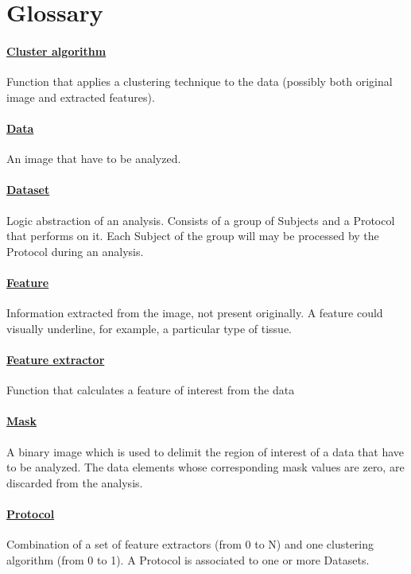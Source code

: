 \section{Glossary}
\label{glossary}

\paragraph{\underline{Cluster algorithm}\\}
Function that applies a clustering technique to the data (possibly both original image and extracted features\g{}).

\paragraph{\underline{Data}\\}
An image that have to be analyzed.

\paragraph{\underline{Dataset}\\}
Logic abstraction of an analysis. Consists of a group of Subjects\g{} and a Protocol\g{} that performs on it. Each Subject\g{} of the group will may be processed by the Protocol\g{} during an analysis.

\paragraph{\underline{Feature}\\}
Information extracted from the image, not present originally. A feature could visually underline, for example, a particular type of tissue.

\paragraph{\underline{Feature extractor}\\}
Function that calculates a feature\g{} of interest from the data\g{}

\paragraph{\underline{Mask}\\}
A binary image which is used to delimit the region of interest of a data\g{} that have to be analyzed. The data\g{} elements whose corresponding mask\g{} values are zero, are discarded from the analysis.

\paragraph{\underline{Protocol}\\}
Combination of a set of feature extractors\g{} (from 0 to N) and one clustering algorithm\g{} (from 0 to 1). A Protocol is associated to one or more Datasets\g{}.